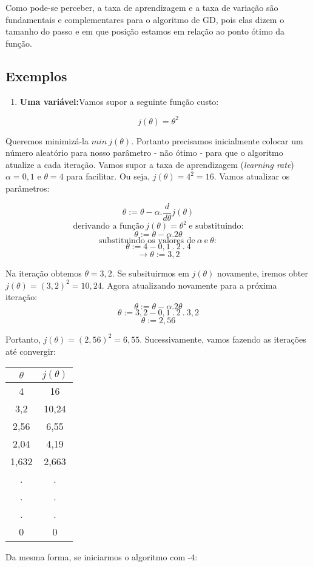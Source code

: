 \documentclass[
]{book}
\providecommand{\tightlist}{%
  \setlength{\itemsep}{0pt}\setlength{\parskip}{0pt}}
\begin{document}
Como pode-se perceber, a taxa de aprendizagem e a taxa de variação são fundamentais e complementares para o algoritmo de GD, pois elas dizem o tamanho do passo e em que posição estamos em relação ao ponto ótimo da função.

\hypertarget{exemplos}{%
\subsection{Exemplos}\label{exemplos}}

\begin{enumerate}
\def\labelenumi{\arabic{enumi}.}
\tightlist
\item
  \textbf{Uma variável:}Vamos supor a seguinte função custo:
\end{enumerate}

\[j(\theta)=\theta^2\]

Queremos minimizá-la \(min \ j(\theta)\). Portanto precisamos inicialmente colocar um número aleatório para nosso parâmetro - não ótimo - para que o algoritmo atualize a cada iteração. Vamos supor a taxa de aprendizagem (\emph{learning rate}) \(\alpha=0,1\) e \(\theta=4\) para facilitar. Ou seja, \(j(\theta)=4^2=16\). Vamos atualizar os parâmetros:

\[\theta := \theta-\alpha.\frac{d}{d\theta}j(\theta) \]
\[\mbox{derivando a função} \ j(\theta)=\theta^2 \ \mbox{e substituindo:}\]
\[\theta:= \theta -\alpha.2\theta \]
\[\mbox{substituindo os valores de}\ \alpha\ \mbox{e}\ \theta: \]
\[\theta:=4-0,1 \ .\ 2\ .\ 4 \]
\[\rightarrow \theta:=3,2\]

Na iteração obtemos \(\theta=3,2\). Se subsituirmos em \(j(\theta)\) novamente, iremos obter \(j(\theta)=(3,2)^2=10,24\). Agora atualizando novamente para a próxima iteração:
\[\theta:= \theta -\alpha.2\theta \]
\[\theta:=3,2-0,1\ .\ 2\ .\ 3,2\]
\[\theta:= 2,56\]

Portanto, \(j(\theta)=(2,56)^2=6,55\). Sucessivamente, vamos fazendo as iterações até convergir:

\begin{longtable}[]{@{}cc@{}}
\toprule
\textbf{\(\theta\)} & \textbf{\(j(\theta)\)}\tabularnewline
\midrule
\endhead
4 & 16\tabularnewline
3,2 & 10,24\tabularnewline
2,56 & 6,55\tabularnewline
2,04 & 4,19\tabularnewline
1,632 & 2,663\tabularnewline
. & .\tabularnewline
. & .\tabularnewline
. & .\tabularnewline
0 & 0\tabularnewline
\bottomrule
\end{longtable}

Da mesma forma, se iniciarmos o algoritmo com -4:
\end{document}
